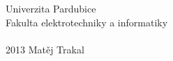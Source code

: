 \begin{titlepage}
\renewcommand{\baselinestretch}{1} %
\begin{center}

\Large\sc
Univerzita Pardubice\\
Fakulta elektrotechniky a informatiky\\[90mm]

{\Huge{}}\\[90mm]

2013 \hfill Matěj Trakal

\begin{comment}
	\begin{tabular}{lp{7cm}r}
	2013 && Matěj Trakal
	\end{tabular}
\end{comment}


\end{center}
\end{titlepage} %
\normalsize %






\begin{comment}
	\newpage
	\begin{titlepage} %
	{\Large\bf Analýza možností nasazení Cloud computing}\\ %
	\vspace{5mm}
	???Katedra informačních technologií\\ %
	\end{center}
	\vspace{15mm}
	
	\large
	\noindent Vedoucí bakalářské práce: ??? Josef Horálek %
	
	???Katedra softwarových technologií
	\vspace{1mm} 
	
	\noindent Studijní program: Informační technologie %
	
	\vspace{20mm}
	
	\begin{center}
	2010 %
	\end{center}
	
	\end{titlepage} %
	\normalsize %
\end{comment}
